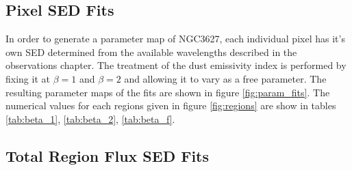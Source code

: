 \subsection{Pixel SED Fits}

In order to generate a parameter map of NGC3627, each individual pixel has it's own SED determined from the available wavelengths described in the observations chapter.  The treatment of the dust emissivity index is performed by fixing it at $\beta=1$ and $\beta=2$ and allowing it to vary as a free parameter.  The resulting parameter maps of the fits are shown in figure \ref{fig:param_fits}. The numerical values for each regions given in figure \ref{fig:regions} are show in tables \ref{tab:beta_1}, \ref{tab:beta_2}, \ref{tab:beta_f}.


\subsection{Total Region Flux SED Fits}
